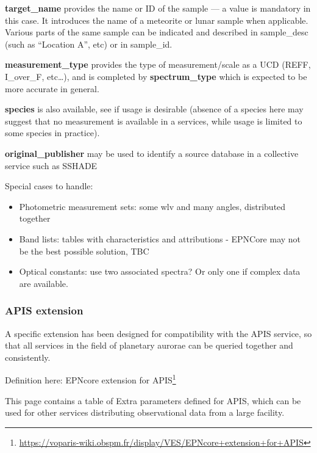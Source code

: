 \documentclass[11pt,a4paper]{ivoa}
\begin{document}
\textbf{target\_name }provides the name or ID of the sample — a value is mandatory in this case. It introduces the name of a meteorite or lunar sample when applicable. Various parts of the same sample can be indicated and described in sample\_desc (such as ``Location A'', etc) or in sample\_id.

\textbf{measurement\_type} provides the type of measurement/scale as a UCD (REFF, I\_over\_F, etc…), and is completed by \textbf{spectrum\_type} which is expected to be more accurate in general.

\textbf{species} is also available, see if usage is desirable (absence of a species here may suggest that no measurement is available in a services, while usage is limited to some species in practice).

\textbf{original\_publisher }may be used to identify a source database in a collective service such as SSHADE


Special cases to handle:

\begin{itemize}

\item Photometric measurement sets: some wlv and many angles, distributed together

\item Band lists: tables with characteristics and attributions - EPNCore may not be the best possible solution, TBC

\item Optical constants: use two associated spectra? Or only one if complex data are available.

\end{itemize}

\subsubsection{APIS extension\\}

A specific extension has been designed for compatibility with the APIS service, so that all services in the field of planetary aurorae can be queried together and consistently.

Definition here: EPNcore extension for APIS\footnote{\url{https://voparis-wiki.obspm.fr/display/VES/EPNcore+extension+for+APIS}}

This page contains a table of Extra parameters defined for APIS, which can be used for other services distributing observational data from a large facility.
\end{document}
